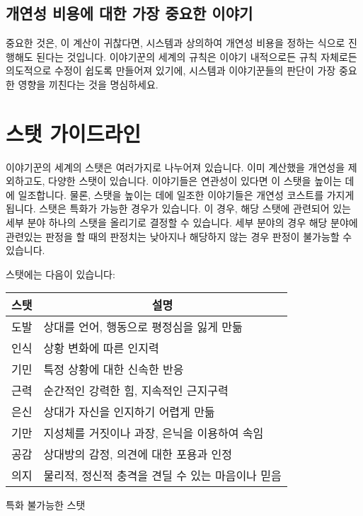 \documentclass[12pt]{report}
\begin{document}
	\section*{개연성 비용에 대한 가장 중요한 이야기}
	중요한 것은, 이 계산이 귀찮다면, 시스템과 상의하여 개연성 비용을 정하는 식으로 진행해도 된다는 것입니다. 이야기꾼의 세계의 규칙은 이야기 내적으로든 규칙 자체로든 의도적으로 수정이 쉽도록 만들어져 있기에, 시스템과 이야기꾼들의 판단이 가장 중요한 영향을 끼친다는 것을 명심하세요.
	
	\chapter{스탯 가이드라인}
	이야기꾼의 세계의 스탯은 여러가지로 나누어져 있습니다. 이미 계산했을 개연성을 제외하고도, 다양한 스탯이 있습니다. 이야기들은 연관성이 있다면 이 스탯을 높이는 데에 일조합니다. 물론, 스탯을 높이는 데에 일조한 이야기들은 개연성 코스트를 가지게 됩니다.
	스탯은 특화가 가능한 경우가 있습니다. 이 경우, 해당 스탯에 관련되어 있는 세부 분야 하나의 스탯을 올리기로 결정할 수 있습니다. 세부 분야의 경우 해당 분야에 관련있는 판정을 할 때의 판정치는 낮아지나 해당하지 않는 경우 판정이 불가능할 수 있습니다.
	
	스탯에는 다음이 있습니다:
	
	\bigskip

	\begin{tabularx}{\textwidth}{c|X}
		\hline
		\textbf{스탯} & \multicolumn{1}{c|}{\textbf{설명}}\\ \hline \hline
		도발          & 상대를 언어, 행동으로 평정심을 잃게 만듦\\\hline
		인식          & 상황 변화에 따른 인지력          \\\hline
		기민          & 특정 상황에 대한 신속한 반응       \\\hline
		근력          & 순간적인 강력한 힘, 지속적인 근지구력  \\\hline
		은신          & 상대가 자신을 인지하기 어렵게 만듦    \\\hline
		기만          & 지성체를 거짓이나 과장, 은닉을 이용하여 속임 \\\hline
		공감          & 상대방의 감정, 의견에 대한 포용과 인정 \\\hline
		의지          & 물리적, 정신적 충격을 견딜 수 있는 마음이나 믿음\\\hline
	\end{tabularx}
	
	\bigskip
	
	\begin{center}
		특화 불가능한 스탯
	\end{center}
	
\end{document}
